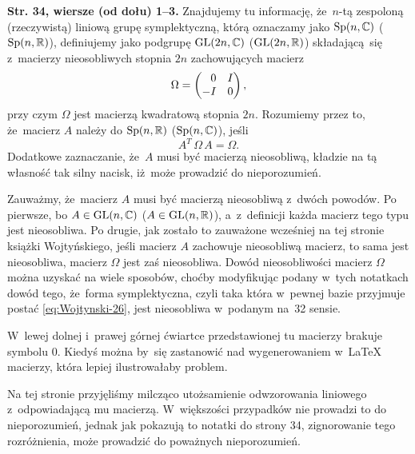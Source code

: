 \documentclass[a4paper,11pt]{article}
\begin{document}
\noindent
\textbf{Str. 34, wiersze (od dołu) 1--3.} Znajdujemy tu informację,
że~$n$-tą zespoloną (rzeczywistą) liniową grupę symplektyczną, którą
oznaczamy jako $\mathrm{Sp}( n, \mathbb{C} )$ ($\mathrm{Sp}( n, \mathbb{R} )$), definiujemy
jako podgrupę $\mathrm{GL}( 2n, \mathbb{C} )$ ($\mathrm{GL}( 2n, \mathbb{R} )$) składającą~się
z~macierzy nieosobliwych stopnia $2n$ zachowujących macierz
\begin{equation}
  \label{eq:Wojtynski-28}
  \Omega =
  \begin{pmatrix}
    \hphantom{-} 0 & I \\
    -I & 0
  \end{pmatrix},
\end{equation}
przy czym $\Omega$ jest macierzą kwadratową stopnia $2n$. Rozumiemy przez to,
że~macierz $A$ należy do $\mathrm{Sp}( n, \mathbb{R} )$ ($\mathrm{Sp}( n, \mathbb{C} )$), jeśli
\begin{equation}
  \label{eq:Wojtynski-29}
  A^{ T } \, \Omega \, A = \Omega.
\end{equation}
Dodatkowe zaznaczanie, że~$A$ musi być macierzą nieosobliwą, kładzie na tą
własność tak silny nacisk, iż~może prowadzić do nieporozumień.

Zauważmy, że~macierz $A$ musi być macierzą nieosobliwą z~dwóch powodów. Po
pierwsze, bo $A \in \mathrm{GL}( n, \mathbb{C})$ ($A \in \mathrm{GL}( n, \mathbb{R} )$), a~z~definicji
każda macierz tego typu jest nieosobliwa. Po drugie, jak zostało to
zauważone wcześniej na tej stronie książki Wojtyńskiego, jeśli macierz $A$
zachowuje nieosobliwą macierz, to sama jest nieosobliwa, macierz $\Omega$ jest
zaś nieosobliwa. Dowód nieosobliwości macierz $\Omega$ można uzyskać na wiele
sposobów, choćby modyfikując podany w~tych notatkach dowód tego, że~forma
symplektyczna, czyli taka która w~pewnej bazie przyjmuje postać
\eqref{eq:Wojtynski-26}, jest nieosobliwa w~podanym na~32 sensie.

\vspace{\spaceFour}





 W~lewej dolnej i~prawej górnej ćwiartce przedstawionej tu
macierzy brakuje symbolu $0$. Kiedyś można by~się zastanowić nad
wygenerowaniem w~\LaTeX{} macierzy, która lepiej ilustrowałaby problem.

\vspace{\spaceFour}





 Na tej stronie przyjęliśmy milcząco utożsamienie odwzorowania
liniowego z~odpowiadającą mu macierzą. W~większości przypadków nie prowadzi
to do nieporozumień, jednak jak pokazują to notatki do strony 34,
zignorowanie tego rozróżnienia, może prowadzić do poważnych nieporozumień.
\end{document}
